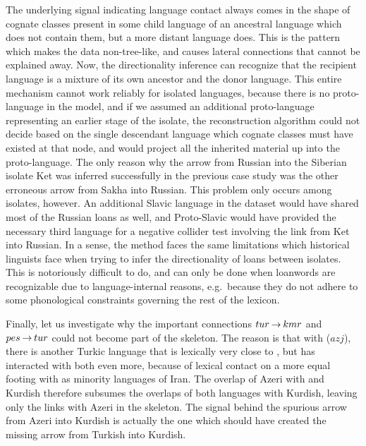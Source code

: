 The underlying signal indicating language contact always comes in the shape of cognate classes present in some child language of an ancestral language which does not contain them, but a more distant language does. This is the pattern which makes the data non-tree-like, and causes lateral connections that cannot be explained away. Now, the directionality inference can recognize that the recipient language is a mixture of its own ancestor and the donor language. This entire mechanism cannot work reliably for isolated languages, because there is no proto-language in the model, and if we assumed an additional proto-language representing an earlier stage of the isolate, the reconstruction algorithm could not decide based on the single descendant language which cognate classes must have existed at that node, and would project all the inherited material up into the proto-language. The only reason why the arrow from Russian into the Siberian isolate Ket was inferred successfully in the previous case study was the 
other erroneous arrow from Sakha into Russian. This problem only occurs among isolates, however. An additional Slavic language in the dataset would have shared most of the Russian loans as well, and Proto-Slavic would have provided the necessary third language for a negative collider test involving the link from Ket into Russian. In a sense, the method faces the same limitations which historical linguists face when trying to infer the directionality of loans between isolates. This is notoriously difficult to do, and can only be done when loanwords are recognizable due to language-internal reasons, e.g.\ because they do not adhere to some phonological constraints governing the rest of the lexicon.
 
Finally, let us investigate  why the important connections $tur \kern 2pt\hbox{$\rightarrow$}\kern 2pt kmr$ and $pes \kern 2pt\hbox{$\rightarrow$}\kern 2pt tur$ could not become part of the skeleton. The reason is that with  ($azj$), there is another Turkic language that is lexically very close to , but has interacted with both  even more, because of lexical contact on a more equal footing with  as minority languages of Iran. The overlap of Azeri with  and Kurdish therefore subsumes the overlaps of both languages with Kurdish, leaving only the links with Azeri in the skeleton. The signal behind the spurious arrow from Azeri into Kurdish is actually the one which should have created the missing arrow from Turkish into Kurdish.
 

